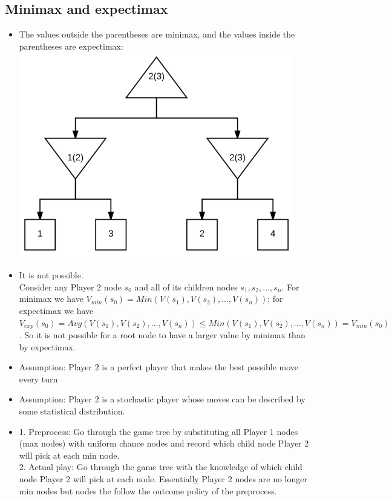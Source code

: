 \documentclass[11pt]{article}
\begin{document}
\begin{onehalfspace}
\section{Minimax and expectimax}
\begin{itemize}
\item The values outside the parentheses are minimax, and the values inside the parentheses are expectimax:\\
\includegraphics[width=12cm, height=9cm]{2_1.png}\\
\item
It is not possible.\\
Consider any Player 2 node $s_0$ and all of its children nodes $s_1,s_2,...,s_n$. For minimax we have $V_{min}(s_0) = Min(V(s_1), V(s_2), ..., V(s_n))$; for expectimax we have $V_{exp}(s_0) = Avg(V(s_1), V(s_2), ..., V(s_n)) \leq Min(V(s_1), V(s_2), ..., V(s_n)) = V_{min}(s_0)$. So it is not possible for a root node to have a larger value by minimax than by expectimax.\\
\item
Assumption: Player 2 is a perfect player that makes the best possible move every turn\\
\item
Assumption: Player 2 is a stochastic player whose moves can be described by some statistical distribution.\\
\item
1. Preprocess: Go through the game tree by substituting all Player 1 nodes (max nodes) with uniform chance nodes and record which child node Player 2 will pick at each min node.\\
2. Actual play: Go through the game tree with the knowledge of which child node Player 2 will pick at each node. Essentially Player 2 nodes are no longer min nodes but nodes the follow the outcome policy of the preprocess.\\
\end{itemize}
\end{onehalfspace}
\end{document}

